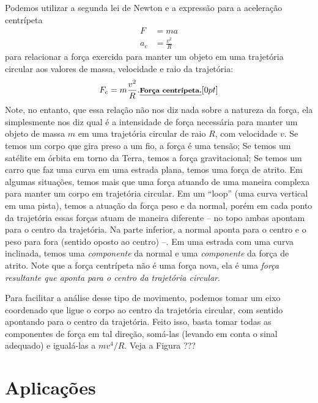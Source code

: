 Podemos utilizar a segunda lei de Newton e a expressão para a aceleração centrípeta
\begin{align}
  F &= ma \\
  a_c &= \frac{v^2}{R}
\end{align}
%
para relacionar a força exercida para manter um objeto em uma trajetória circular aos valores de massa, velocidade e raio da trajetória:
\begin{equation}
  F_c = m \frac{v^2}{R}. \relax{\footnotesize\emph{\textbf{Força centrípeta.}}}[0pt]
\end{equation}
%
Note, no entanto, que essa relação não nos diz nada sobre a natureza da força, ela simplesmente nos diz qual é a intensidade de força necessária para manter um objeto de massa $m$ em uma trajetória circular de raio $R$, com velocidade $v$. Se temos um corpo que gira preso a um fio, a força é uma tensão; Se temos um satélite em órbita em torno da Terra, temos a força gravitacional; Se temos um carro que faz uma curva em uma estrada plana, temos uma força de atrito. Em algumas situações, temos mais que uma força atuando de uma maneira complexa para manter um corpo em trajetória circular. Em um ``loop'' (uma curva vertical em uma pista), temos a atuação da força peso e da normal, porém em cada ponto da trajetória essas forças atuam de maneira diferente -- no topo ambas apontam para o centro da trajetória. Na parte inferior, a normal aponta para o centro e o peso para fora (sentido oposto ao centro) --. Em uma estrada com uma curva inclinada, temos uma \emph{componente} da normal e uma \emph{componente} da força de atrito. Note que a força centrípeta não é uma força nova, ela é uma \emph{força resultante que aponta para o centro da trajetória circular}.

Para facilitar a análise desse tipo de movimento, podemos tomar um eixo coordenado que ligue o corpo ao centro da trajetória circular, com sentido apontando para o centro da trajetória. Feito isso, basta tomar todas as componentes de força em tal direção, somá-las (levando em conta o sinal adequado) e igualá-las a $m v^4/R$. Veja a Figura ??? 

\section{Aplicações} %

